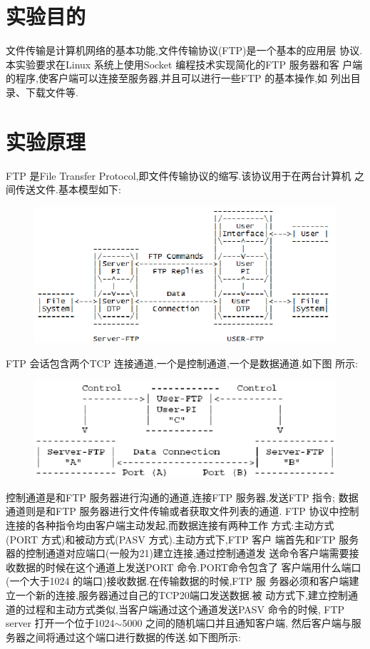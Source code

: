 

\section{实验目的}
文件传输是计算机网络的基本功能,文件传输协议(FTP)是一个基本的应用层
协议.本实验要求在Linux 系统上使用Socket 编程技术实现简化的FTP 服务器和客
户端的程序,使客户端可以连接至服务器,并且可以进行一些FTP 的基本操作,如
列出目录、下载文件等.

\section{实验原理}

FTP 是File Transfer Protocol,即文件传输协议的缩写.该协议用于在两台计算机
之间传送文件.基本模型如下:
\begin{figure}[H]
  \centering
  \includegraphics[width=\textwidth]{res/ftp1.png}
\end{figure}

FTP 会话包含两个TCP 连接通道,一个是控制通道,一个是数据通道.如下图
所示:
\begin{figure}[H]
  \centering
  \includegraphics[width=\textwidth]{res/ftp2.png}
\end{figure}

控制通道是和FTP 服务器进行沟通的通道,连接FTP 服务器,发送FTP 指令;
数据通道则是和FTP 服务器进行文件传输或者获取文件列表的通道.
FTP 协议中控制连接的各种指令均由客户端主动发起,而数据连接有两种工作
方式:主动方式(PORT 方式)和被动方式(PASV 方式).主动方式下,FTP 客户
端首先和FTP 服务器的控制通道对应端口(一般为21)建立连接,通过控制通道发
送命令客户端需要接收数据的时候在这个通道上发送PORT 命令.PORT命令包含了
客户端用什么端口(一个大于1024 的端口)接收数据.在传输数据的时候,FTP 服
务器必须和客户端建立一个新的连接,服务器通过自己的TCP20端口发送数据.被
动方式下,建立控制通道的过程和主动方式类似,当客户端通过这个通道发送PASV
命令的时候, FTP server 打开一个位于1024$ \sim$5000 之间的随机端口并且通知客户端,
然后客户端与服务器之间将通过这个端口进行数据的传送.如下图所示:


